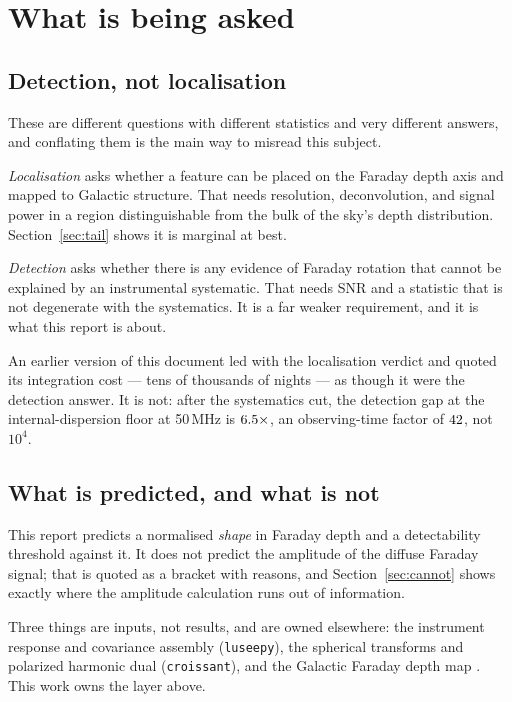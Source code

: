 \documentclass[11pt]{article}
\newcommand{\code}[1]{\texttt{#1}}
\begin{document}
\section{What is being asked}
\label{sec:scope}

\subsection{Detection, not localisation}

These are different questions with different statistics and very
different answers, and conflating them is the main way to misread this
subject.

\emph{Localisation} asks whether a feature can be placed on the Faraday
depth axis and mapped to Galactic structure. That needs resolution,
deconvolution, and signal power in a region distinguishable from the
bulk of the sky's depth distribution. Section~\ref{sec:tail} shows it is
marginal at best.

\emph{Detection} asks whether there is any evidence of Faraday rotation
that cannot be explained by an instrumental systematic. That needs SNR
and a statistic that is not degenerate with the systematics. It is a
far weaker requirement, and it is what this report is about.

An earlier version of this document led with the localisation verdict
and quoted its integration cost --- tens of thousands of nights --- as
though it were the detection answer. It is not: after the systematics
cut, the detection gap at the internal-dispersion floor at 50\,MHz is
$6.5\times$, an observing-time factor of
$42$, not $10^4$.

\subsection{What is predicted, and what is not}

This report predicts a normalised \emph{shape} in Faraday depth and a
detectability threshold against it. It does not predict the amplitude
of the diffuse Faraday signal; that is quoted as a bracket with
reasons, and Section~\ref{sec:cannot} shows exactly where the amplitude
calculation runs out of information.

Three things are inputs, not results, and are owned elsewhere: the
instrument response and covariance assembly (\code{luseepy}), the
spherical transforms and polarized harmonic dual (\code{croissant}),
and the Galactic Faraday depth map \citep{hutschenreuter2022}. This
work owns the layer above.
\end{document}
